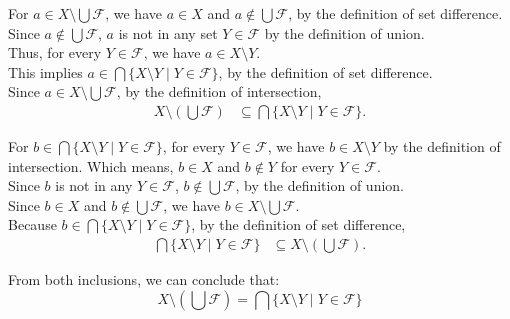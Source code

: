 \documentclass[12pt,a4paper]{article}
\begin{document}
For $a \in X \setminus \bigcup \mathcal{F}$, we have $a \in X$ and $a \notin \bigcup \mathcal{F}$, by the definition of set difference.\\
Since $a \notin \bigcup \mathcal{F}$, $a$ is not in any set $Y \in \mathcal{F}$ by the definition of union.\\
Thus, for every $Y \in \mathcal{F}$, we have $a \in X \setminus Y$.\\
This implies $a \in \bigcap \{ X \setminus Y \mid Y \in \mathcal{F} \}$, by the definition of set difference.\\
Since $a \in X \setminus \bigcup \mathcal{F}$, by the definition of intersection,
\begin{align*}
X \setminus \left( \bigcup \mathcal{F} \right) &\subseteq \bigcap \{ X \setminus Y \mid Y \in \mathcal{F} \}.
\end{align*}

For $b \in \bigcap \{ X \setminus Y \mid Y \in \mathcal{F} \}$, for every $Y \in \mathcal{F}$, we have $b \in X \setminus Y$ by the definition of intersection. Which means, $b \in X$ and $b \notin Y$ for every $Y \in \mathcal{F}$.\\
Since $b$ is not in any $Y \in \mathcal{F}$, $b \notin \bigcup \mathcal{F}$, by the definition of union.\\
Since $b \in X$ and $b \notin \bigcup \mathcal{F}$, we have $b \in X \setminus \bigcup \mathcal{F}$.\\
 Because $b \in \bigcap \{ X \setminus Y \mid Y \in \mathcal{F} \}$, by the definition of set difference,
\begin{align*}
\bigcap \{ X \setminus Y \mid Y \in \mathcal{F} \} &\subseteq X \setminus \left( \bigcup \mathcal{F} \right).
\end{align*}

From both inclusions, we can conclude that:
\[
X \setminus \left( \bigcup \mathcal{F} \right) = \bigcap \{ X \setminus Y \mid Y \in \mathcal{F} \}
\]
\newpage
\end{document}
